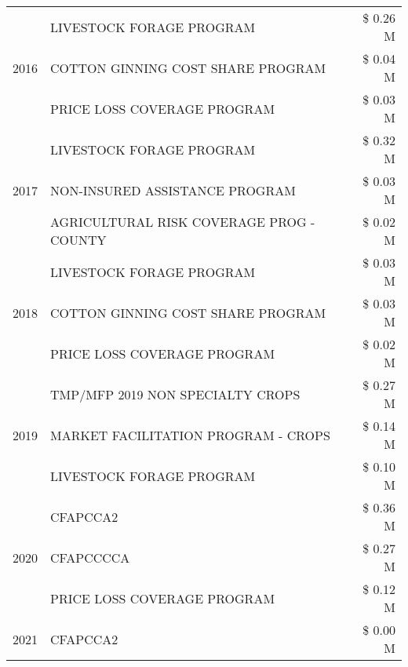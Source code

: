 \begin{tabular}{llr}
\multirow[t]{3}{*}{2016} & LIVESTOCK FORAGE PROGRAM                      & \$ 0.26 M \\
 & COTTON GINNING COST SHARE PROGRAM             & \$ 0.04 M \\
 & PRICE LOSS COVERAGE PROGRAM                   & \$ 0.03 M \\
\cline{1-3}
\multirow[t]{3}{*}{2017} & LIVESTOCK FORAGE PROGRAM & \$ 0.32 M \\
 & NON-INSURED ASSISTANCE PROGRAM & \$ 0.03 M \\
 & AGRICULTURAL RISK COVERAGE PROG - COUNTY & \$ 0.02 M \\
\cline{1-3}
\multirow[t]{3}{*}{2018} & LIVESTOCK FORAGE PROGRAM & \$ 0.03 M \\
 & COTTON GINNING COST SHARE PROGRAM & \$ 0.03 M \\
 & PRICE LOSS COVERAGE PROGRAM & \$ 0.02 M \\
\cline{1-3}
\multirow[t]{3}{*}{2019} & TMP/MFP 2019 NON SPECIALTY CROPS & \$ 0.27 M \\
 & MARKET FACILITATION PROGRAM - CROPS & \$ 0.14 M \\
 & LIVESTOCK FORAGE PROGRAM & \$ 0.10 M \\
\cline{1-3}
\multirow[t]{3}{*}{2020} & CFAPCCA2 & \$ 0.36 M \\
 & CFAPCCCCA & \$ 0.27 M \\
 & PRICE LOSS COVERAGE PROGRAM & \$ 0.12 M \\
\cline{1-3}
2021 & CFAPCCA2 & \$ 0.00 M \\
\cline{1-3}
\bottomrule
\end{tabular}
